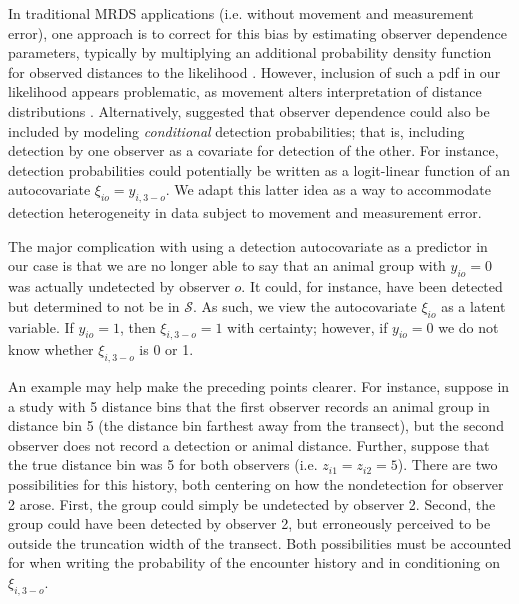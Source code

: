 \documentclass[aoas,preprint]{imsart}
\numberwithin{equation}{section}
\theoremstyle{plain}
\begin{document}
In traditional MRDS applications (i.e. without movement and measurement error), one approach is to correct for this bias by estimating observer dependence parameters, typically by multiplying an additional probability density function for observed distances to the likelihood \citep[cf.][]{BucklandEtAl2010}.  However, inclusion of such a pdf in our likelihood appears problematic, as movement alters interpretation of distance distributions \citep{BurtEtAl2014}.  Alternatively, \citet{MacKenzieClement2016} suggested that observer dependence could also be included by modeling \textit{conditional} detection probabilities; that is, including detection by one observer as a covariate for detection of the other.  For instance, detection probabilities could potentially be written as a logit-linear function of an autocovariate $\xi_{io} = y_{i,3-o}$.  We adapt this latter idea as a way to accommodate detection heterogeneity in data subject to movement and measurement error.

The major complication with using a detection autocovariate as a predictor in our case is that we are no longer able to say that an animal group with $y_{io}=0$ was actually undetected by observer $o$.  It could, for instance, have been detected but determined to not be in $\mathcal{S}$.  As such, we view the autocovariate $\xi_{io}$ as a latent variable.  If $y_{io}=1$, then $\xi_{i,3-o}=1$ with certainty; however, if $y_{io}=0$ we do not know whether $\xi_{i,3-o}$ is 0 or 1.

An example may help make the preceding points clearer.  For instance, suppose in a study with 5 distance bins that the first observer records an animal group in distance bin 5 (the distance bin farthest away from the transect), but the second observer does not record a detection or animal distance.  Further, suppose that the true distance bin was 5 for both observers (i.e. $z_{i1}=z_{i2}=5$).  There are two possibilities for this history, both centering on how the nondetection for observer 2 arose. First, the group could simply be undetected by observer 2.  Second, the group could have been detected by observer 2, but erroneously perceived to be outside the truncation width of the transect.  Both possibilities must be accounted for when writing the probability of the encounter history and in conditioning on $\xi_{i,3-o}$.
\end{document}
